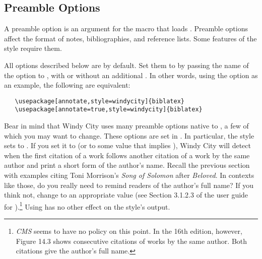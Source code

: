 \documentclass[11pt,letterpaper,oneside]{article}
\begin{document}
\subsection{Preamble Options}
\label{preops}

A preamble option is an argument for the  macro that
loads \biblatex. Preamble options affect the format of notes,
bibliographies, and reference lists. Some features of the style
require them.

All options described below are  by default. Set them to
 by passing the name of the option to \biblatex, with or
without an additional . In other words, using the option
 as an example, the following are equivalent:

\begin{verbatim}
   \usepackage[annotate,style=windycity]{biblatex}
   \usepackage[annotate=true,style=windycity]{biblatex}
\end{verbatim}

Bear in mind that Windy City uses many preamble options native to
\biblatex, a few of which you may want to change. These options are
set in . In particular, the style sets
 to . If you set it to  (or to
some value that implies ), Windy City will detect when the
first citation of a work follows another citation of a work by the
same author and print a short form of the author's name. Recall the
previous section with examples citing Toni Morrison's \textit{Song of
Solomon} after \textit{Beloved}. In contexts like those, do you really
need to remind readers of the author's full name? If you think not,
change  to an appropriate value (see Section 3.1.2.3
of the user guide for \biblatex).\footnote{\textit{CMS} seems to have
no policy on this point. In the 16th edition, however, Figure 14.3
shows consecutive citations of works by the same author. Both
citations give the author's full name.} Using  has no
other effect on the style's output.
\end{document}
